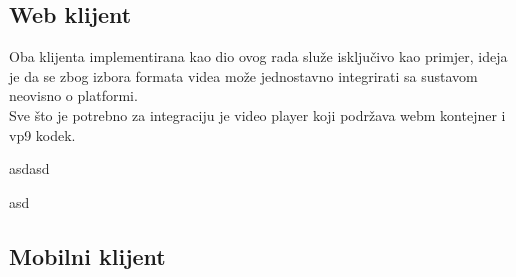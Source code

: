 \subsection{Web klijent}
Oba klijenta implementirana kao dio ovog rada služe isključivo kao primjer, ideja je da se zbog izbora formata videa može jednostavno
integrirati sa sustavom neovisno o platformi. \\
Sve što je potrebno za integraciju je video player koji podržava webm kontejner i vp9 kodek.

asdasd

asd

\clearpage
\subsection{Mobilni klijent}


